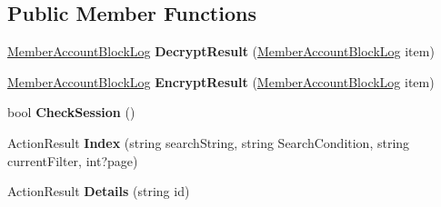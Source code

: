 \subsection*{Public Member Functions}
\begin{DoxyCompactItemize}
\item 
\hyperlink{class_cloud_bread_admin_web_1_1_member_account_block_log}{Member\+Account\+Block\+Log} {\bfseries Decrypt\+Result} (\hyperlink{class_cloud_bread_admin_web_1_1_member_account_block_log}{Member\+Account\+Block\+Log} item)\hypertarget{class_cloud_bread_admin_web_1_1_controllers_1_1_member_account_block_logs_controller_a97389f0f0204050445f355bf1fd3eb60}{}\label{class_cloud_bread_admin_web_1_1_controllers_1_1_member_account_block_logs_controller_a97389f0f0204050445f355bf1fd3eb60}

\item 
\hyperlink{class_cloud_bread_admin_web_1_1_member_account_block_log}{Member\+Account\+Block\+Log} {\bfseries Encrypt\+Result} (\hyperlink{class_cloud_bread_admin_web_1_1_member_account_block_log}{Member\+Account\+Block\+Log} item)\hypertarget{class_cloud_bread_admin_web_1_1_controllers_1_1_member_account_block_logs_controller_a2992caf1ef28e0e062294884f46c40ad}{}\label{class_cloud_bread_admin_web_1_1_controllers_1_1_member_account_block_logs_controller_a2992caf1ef28e0e062294884f46c40ad}

\item 
bool {\bfseries Check\+Session} ()\hypertarget{class_cloud_bread_admin_web_1_1_controllers_1_1_member_account_block_logs_controller_acccca9b93b2ddad405f761dc4922d883}{}\label{class_cloud_bread_admin_web_1_1_controllers_1_1_member_account_block_logs_controller_acccca9b93b2ddad405f761dc4922d883}

\item 
Action\+Result {\bfseries Index} (string search\+String, string Search\+Condition, string current\+Filter, int?page)\hypertarget{class_cloud_bread_admin_web_1_1_controllers_1_1_member_account_block_logs_controller_ae17174978a9678a49f256de92d0ca141}{}\label{class_cloud_bread_admin_web_1_1_controllers_1_1_member_account_block_logs_controller_ae17174978a9678a49f256de92d0ca141}

\item 
Action\+Result {\bfseries Details} (string id)\hypertarget{class_cloud_bread_admin_web_1_1_controllers_1_1_member_account_block_logs_controller_aaa502eb3cc7fe1d73cd04bdf354cfcf3}{}\label{class_cloud_bread_admin_web_1_1_controllers_1_1_member_account_block_logs_controller_aaa502eb3cc7fe1d73cd04bdf354cfcf3}


\end{DoxyCompactItemize}
